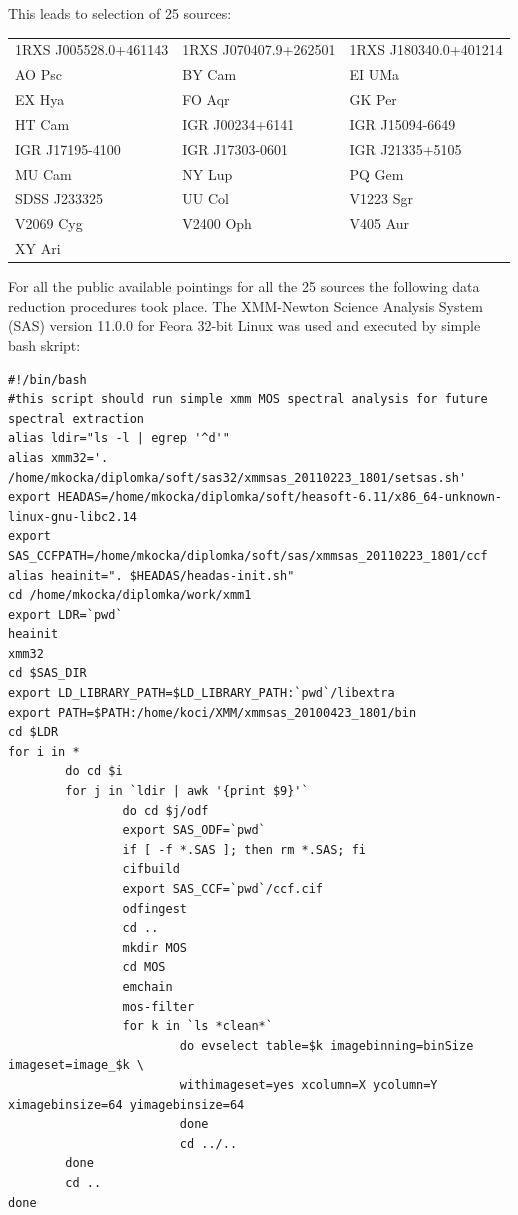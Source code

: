 \documentclass[oneside,a4paper,11pt]{report}
\begin{document}
This leads to selection of 25 sources:

\begin{footnotesize} 
\begin{tabular}{l l l }\footnotesize
1RXS J005528.0+461143 & 1RXS J070407.9+262501 & 1RXS J180340.0+401214 \\
AO Psc & BY Cam & EI UMa \\
EX Hya & FO Aqr & GK Per\\
HT Cam & IGR J00234+6141 & IGR J15094-6649 \\
IGR J17195-4100 & IGR J17303-0601 & IGR J21335+5105\\
MU Cam & NY Lup& PQ Gem\\
SDSS J233325 & UU Col& V1223 Sgr\\
V2069 Cyg & V2400 Oph &V405 Aur \\
XY Ari & &  \\
\end{tabular}
\end{footnotesize}

For all the public available pointings for all the 25 sources the following data reduction procedures 
took place. The XMM-Newton Science Analysis System (SAS) version 11.0.0 for Feora 32-bit Linux 
was used and executed by simple bash skript: 
\begin{tiny}
\begin{verbatim}
#!/bin/bash
#this script should run simple xmm MOS spectral analysis for future spectral extraction
alias ldir="ls -l | egrep '^d'"
alias xmm32='. /home/mkocka/diplomka/soft/sas32/xmmsas_20110223_1801/setsas.sh'
export HEADAS=/home/mkocka/diplomka/soft/heasoft-6.11/x86_64-unknown-linux-gnu-libc2.14
export SAS_CCFPATH=/home/mkocka/diplomka/soft/sas/xmmsas_20110223_1801/ccf
alias heainit=". $HEADAS/headas-init.sh"
cd /home/mkocka/diplomka/work/xmm1
export LDR=`pwd`
heainit
xmm32
cd $SAS_DIR
export LD_LIBRARY_PATH=$LD_LIBRARY_PATH:`pwd`/libextra
export PATH=$PATH:/home/koci/XMM/xmmsas_20100423_1801/bin
cd $LDR
for i in * 
        do cd $i 
        for j in `ldir | awk '{print $9}'`
                do cd $j/odf
                export SAS_ODF=`pwd`
                if [ -f *.SAS ]; then rm *.SAS; fi
                cifbuild	
                export SAS_CCF=`pwd`/ccf.cif 
                odfingest
                cd ..
                mkdir MOS
                cd MOS
                emchain
                mos-filter 
                for k in `ls *clean*` 
                        do evselect table=$k imagebinning=binSize imageset=image_$k \
                        withimageset=yes xcolumn=X ycolumn=Y ximagebinsize=64 yimagebinsize=64
                        done 
                        cd ../..
        done
        cd ..
done 
\end{verbatim}
\end{tiny}
\end{document}
